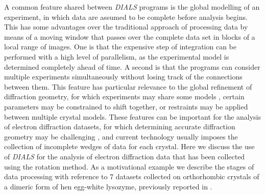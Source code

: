 \documentclass[preprint]{iucr}
\newcommand{\dials}{\emph{DIALS}\xspace}
\newcounter{MCCounter}
\newcommand{\MC}[1]{%
   \stepcounter{MCCounter}%
   {\color{blue}{\textbf{MC \#\arabic{MCCounter}: }#1}}%
  }
\begin{document}

A common feature shared between \dials programs is the global modelling of an
experiment, in which data are assumed to be complete before analysis begins.
This has some advantages over the traditional approach of processing data by
means of a moving window that passes over the complete data set in blocks of a
local range of images. One is that the expensive step of integration can be
performed with a high level of parallelism, as the experimental model is
determined completely ahead of time. A second is that the programs can consider
multiple experiments simultaneously without losing track of the connections
between them. This feature has particular relevance to the global refinement of
diffraction geometry, for which experiments may share some models
\cite{Waterman2016}, certain parameters may be constrained to shift together,
or restraints may be applied between multiple crystal models. These features
can be important for the analysis of electron diffraction datasets, for which
determining accurate diffraction geometry may be challenging
\cite{review_adt_red:2015}, and current technology usually imposes the
collection of incomplete wedges of data for each crystal. Here we discuss the
use of \dials for the analysis of electron diffraction data that has been
collected using the rotation method. As a motivational example we describe the
stages of data processing with reference to 7 datasets collected on
orthorhombic crystals of a dimeric form of hen egg-white lysozyme, previously
reported in .
\end{document}
